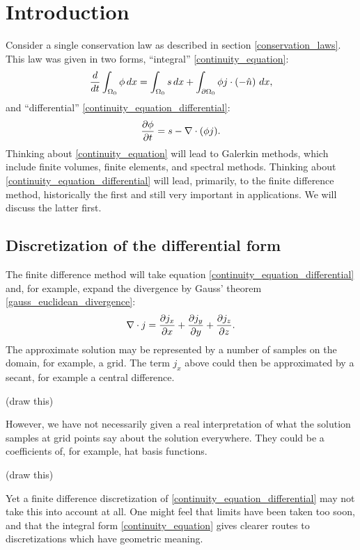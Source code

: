 
\section{Introduction}
Consider a single conservation law as described in section \ref{conservation_laws}. This law
was given in two forms, ``integral'' \eqref{continuity_equation}:
\begin{equation*}
    \frac{d}{dt} \int_{\Omega_0} \phi\,dx = \int_{\Omega_0} s\,dx + \int_{{\partial\Omega_0}} \phi j \cdot \left(-\hat{n}\right)\,dx,
\end{equation*}
and ``differential'' \eqref{continuity_equation_differential}:
\begin{equation*}
    \frac{\partial \phi}{\partial t} = s - \nabla\cdot (\phi j).
\end{equation*}
Thinking about \eqref{continuity_equation} will lead to Galerkin methods, which include finite volumes, finite elements, and spectral methods.
Thinking about \eqref{continuity_equation_differential} will lead, primarily, to the finite difference method, historically the first and
still very important in applications. We will discuss the latter first.

\subsection{Discretization of the differential form}
The finite difference method will take equation \eqref{continuity_equation_differential} and, for example, expand the divergence by Gauss' theorem
\eqref{gauss_euclidean_divergence}:
$$
    \nabla \cdot j = \frac{\partial j_x}{\partial x} + \frac{\partial j_y}{\partial y} + \frac{\partial j_z}{\partial z}.
$$
The approximate solution may be represented by a number of samples on the domain, for example, a grid. The term
$j_x$ above could then be approximated by a secant, for example a central difference.

\vskip 0.2in
(draw this)
\vskip 0.2in

However, we have not necessarily given a real interpretation of what the solution samples at grid points say about the solution everywhere.
They could be a coefficients of, for example, hat basis functions.

\vskip 0.2in
(draw this)
\vskip 0.2in

Yet a finite difference discretization of \eqref{continuity_equation_differential} may not take this into account at all. One might feel that
limits have been taken too soon, and that the integral form \eqref{continuity_equation} gives clearer routes to discretizations which
have geometric meaning.

